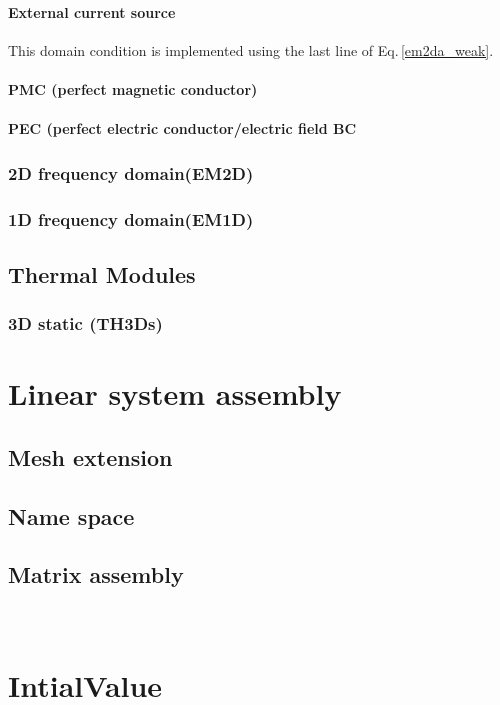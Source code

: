 \documentclass[11pt,a4paper,final]{report}
\begin{document}
 \subsubsection{External current source}
 This domain condition is implemented using the last line of Eq.\,\ref{em2da_weak}. 
 
 \subsubsection{PMC (perfect magnetic conductor)}
 
 \subsubsection{PEC (perfect electric conductor/electric field BC}
  
\subsection{2D frequency domain(EM2D)}

\subsection{1D frequency domain(EM1D)}


\section{Thermal Modules}
\subsection{3D static (TH3Ds)}


\chapter{Linear system assembly}
\section{Mesh extension} 
\section{Name space}
\section{Matrix assembly}
\
\chapter{IntialValue}
\label{InitialValue}    
\end{document}
